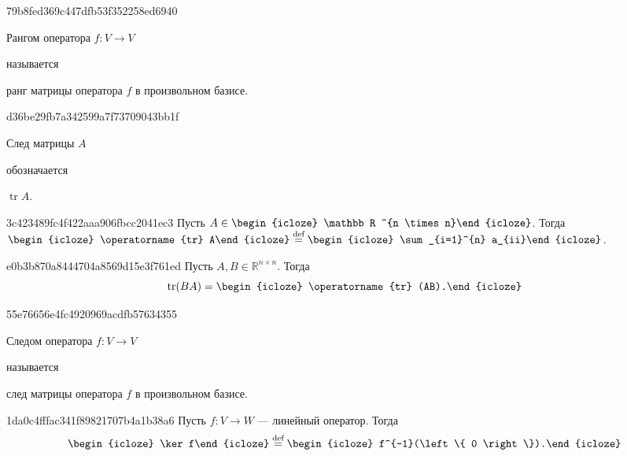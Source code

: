 \begin{note}{79b8fed369c447dfb53f352258ed6940}
    \begin{icloze}{2}Рангом оператора \( f : V \to V \)\end{icloze} называется \begin{icloze}{1}ранг матрицы оператора \( f \) в произвольном базисе.\end{icloze}
\end{note}

\begin{note}{d36be29fb7a342599a7f73709043bb1f}
    \begin{icloze}{2}След матрицы \( A \)\end{icloze} обозначается \begin{icloze}{1}\( \operatorname{tr}  A \).\end{icloze}
\end{note}

\begin{note}{3c423489fc4f422aaa906fbcc2041ec3}
    Пусть \( A \in \begin{icloze}{3}\mathbb R ^{n \times n}\end{icloze} \). Тогда \( \displaystyle \begin{icloze}{2}\operatorname{tr} A\end{icloze} \overset{\text{def}}= \begin{icloze}{1}\sum_{i=1}^{n} a_{ii}\end{icloze} \).
\end{note}

\begin{note}{e0b3b870a8444704a8569d15e3f761ed}
    Пусть \({ A, B \in \mathbb R^{n \times n} }\). Тогда
    \[
        \operatorname{tr} (BA) = \begin{icloze}{1}\operatorname{tr} (AB).\end{icloze}
    \]
\end{note}

\begin{note}{55e76656e4fc4920969acdfb57634355}
    \begin{icloze}{2}Следом оператора \( f : V \to V \)\end{icloze} называется \begin{icloze}{1}след матрицы оператора \( f \) в произвольном базисе.\end{icloze}
\end{note}

\begin{note}{1da0c4fffac341f89821707b4a1b38a6}
    Пусть \( f : V \to W \) --- линейный оператор. Тогда
    \[
        \begin{icloze}{2}\ker f\end{icloze} \overset{\text{def}}= \begin{icloze}{1}f^{-1}(\left\{ 0 \right\}).\end{icloze}
    \]
\end{note}

